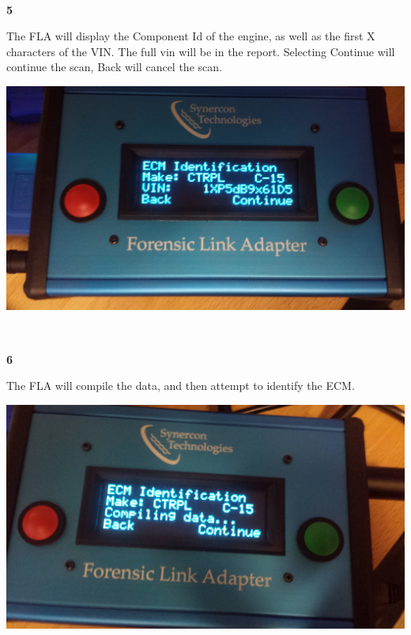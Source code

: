 \documentclass[11pt, oneside]{book}
\begin{document}
\\[\baselineskip]
\noindent\begin{minipage}{0.45\textwidth}%
\begin{center}
\textbf{5}\\[\baselineskip]
\end{center}
The FLA will display the Component Id of the engine, as well as the first X characters of the VIN. The full vin will be in the report. Selecting Continue will continue the scan, Back will cancel the scan.
\end{minipage}%
\hfill%
\begin{minipage}{0.45\textwidth}
\includegraphics[width=\linewidth]{../media/fla_screens/comp_id}
\end{minipage}
\\[\baselineskip]
\noindent\begin{minipage}{0.45\textwidth}%
\begin{center}
\textbf{6}\\[\baselineskip]
\end{center}
The FLA will compile the data, and then attempt to identify the ECM.
\end{minipage}%
\hfill%
\begin{minipage}{0.45\textwidth}
\includegraphics[width=\linewidth]{../media/fla_screens/comp_id_compile}
\end{minipage}
\end{document}
